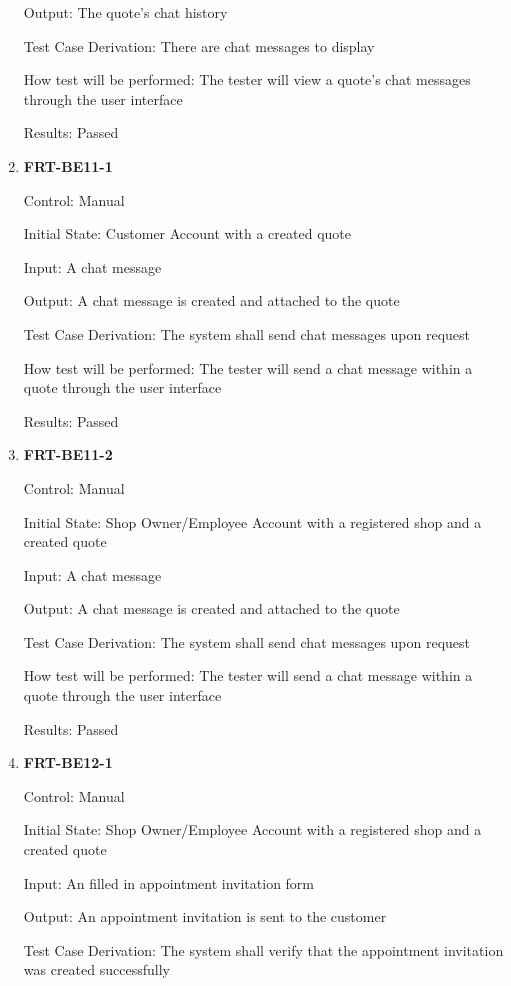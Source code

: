 \documentclass[12pt, titlepage]{article}
\begin{document}
\begin{enumerate}
	      Output: The quote's chat history

	      Test Case Derivation: There are chat messages to display

	      How test will be performed: The tester will view a quote's chat messages through the user interface

	      Results: Passed

	\item \textbf{FRT-BE11-1}

	      Control: Manual

	      Initial State: Customer Account with a created quote

	      Input: A chat message

	      Output: A chat message is created and attached to the quote

	      Test Case Derivation: The system shall send chat messages upon request

	      How test will be performed: The tester will send a chat message within a quote through the user
	      interface

	      Results: Passed

	\item \textbf{FRT-BE11-2}

	      Control: Manual

	      Initial State: Shop Owner/Employee Account with a registered shop and a created quote

	      Input: A chat message

	      Output: A chat message is created and attached to the quote

	      Test Case Derivation: The system shall send chat messages upon request

	      How test will be performed: The tester will send a chat message within a quote through the user
	      interface

	      Results: Passed

	\item \textbf{FRT-BE12-1}

	      Control: Manual

	      Initial State: Shop Owner/Employee Account with a registered shop and a created quote

	      Input: An filled in appointment invitation form

	      Output: An appointment invitation is sent to the customer

	      Test Case Derivation: The system shall verify that the appointment invitation was created
	      successfully


\end{enumerate}
\end{document}
